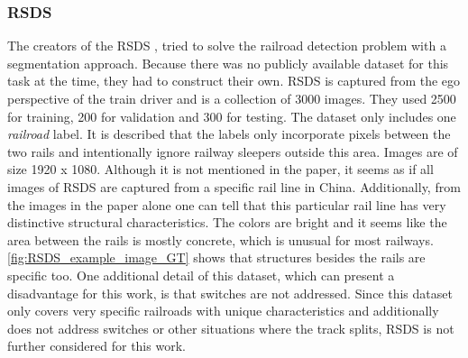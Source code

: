 \subsubsection{RSDS}
\label{subsubsec:RSDS}
The creators of the \ac{RSDS} \cite{railNet2019}, tried to solve the railroad detection problem with a segmentation approach. Because there was no publicly available dataset for this task at the time, they had to construct their own. \ac{RSDS} is captured from the ego perspective of the train driver and is a collection of 3000 images. They used 2500 for training, 200 for validation and 300 for testing. The dataset only includes one \textit{railroad} label. It is described that the labels only incorporate pixels between the two rails and intentionally ignore railway sleepers outside this area. Images are of size 1920 x 1080.
Although it is not mentioned in the paper, it seems as if all images of \ac{RSDS} are captured from a specific rail line in China. Additionally, from the images in the paper alone one can tell that this particular rail line has very distinctive structural characteristics. The colors are bright and it seems like the area between the rails is mostly concrete, which is unusual for most railways. \ref{fig:RSDS_example_image_GT} shows that structures besides the rails are specific too.
One additional detail of this dataset, which can present a disadvantage for this work, is that switches are not addressed.
Since this dataset only covers very specific railroads with unique characteristics and additionally does not address switches or other situations where the track splits, \ac{RSDS} is not further considered for this work.

